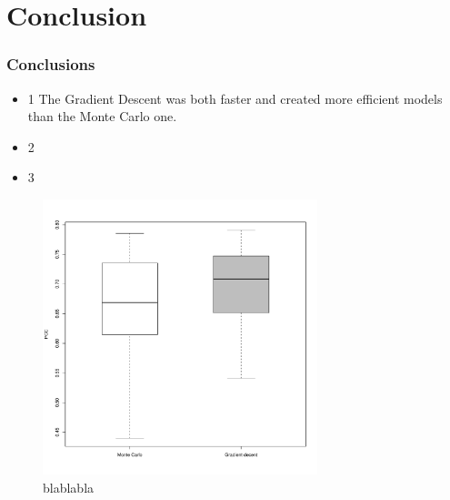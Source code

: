 \documentclass[presentation]{beamer}   %
\begin{document}
\section{Conclusion}
\begin{frame}
\frametitle{Conclusions}
\begin{itemize}
\item 1 The Gradient Descent was both faster and created more efficient models than the Monte Carlo one.
\item 2 \pause
\item 3
\end{itemize}
\end{frame}
\begin{frame}[plain]
	\begin{figure}
	\centering
	\includegraphics[width=80mm,height=80mm]{fig/boxplot.pdf}
	\caption{blablabla}
	\end{figure}
\end{frame}
\end{document}
